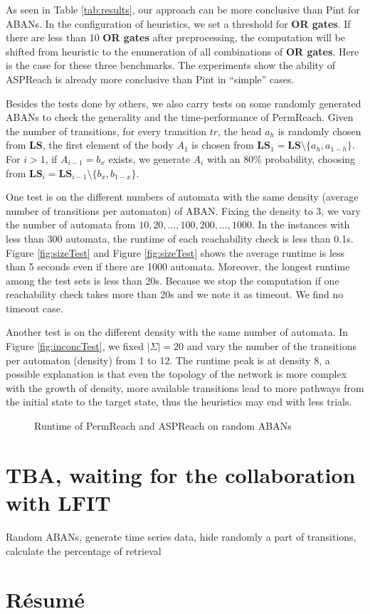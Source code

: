 As seen in Table \ref{tab:results}, our approach can be more conclusive than Pint for ABANs.
In the configuration of heuristics, we set a threshold for \textbf{OR gates}.
If there are less than 10 \textbf{OR gates} after preprocessing, the computation will be shifted from heuristic to the enumeration of all combinations of \textbf{OR gates}.
Here is the case for these three benchmarks. The experiments show the ability of ASPReach is already more conclusive than Pint in ``simple'' cases.

Besides the tests done by others, we also carry tests on some randomly generated ABANs to check the generality and the time-performance of PermReach. 
Given the number of transitions, for every transition $tr$, the head $a_h$ is randomly chosen from $\mathbf{LS}$, the first element of the body $A_1$ is chosen from $\mathbf{LS}_1=\mathbf{LS}\setminus \{a_h,a_{1-h}\}$.
For $i>1$, if $A_{i-1}=b_x$ exists, we generate $A_i$ with an 80\% probability, choosing from $\mathbf{LS}_i=\mathbf{LS}_{i-1}\setminus \{b_x,b_{1-x}\}$. 
 
One test is on the different numbers of automata with the same density (average number of transitions per automaton) of ABAN. Fixing the density to 3, we vary the number of automata from $10,20,\ldots,100,200,\ldots,1000$.
In the instances with less than 300 automata, the runtime of each reachability check is less than 0.1s.
Figure \ref{fig:sizeTest} and Figure \ref{fig:sizeTest} shows the average runtime is less than 5 seconds even if there are 1000 automata. 
Moreover, the longest runtime among the test sets is less than 20s. 
Because we stop the computation if one reachability check takes more than 20s and we note it as timeout.
We find no timeout case.

Another test is on the different density with the same number of automata. 
In Figure \ref{fig:inconcTest}, we fixed $|\Sigma|=20$ and vary the number of the transitions per automaton (density) from 1 to 12.
The runtime peak is at density 8, a possible explanation is that even the topology of the network is more complex with the growth of density, more available transitions lead to more pathways from the initial state to the target state, thus the heuristics may end with less trials.
\begin{figure}[ht]
    \caption[Runtime tests of reachability analyzers]{Runtime of PermReach and ASPReach on random ABANs}
\end{figure}

\section{TBA, waiting for the collaboration with LFIT}
Random ABANs, generate time series data, hide randomly a part of transitions, calculate the percentage of retrieval

\section{R\'esum\'e}